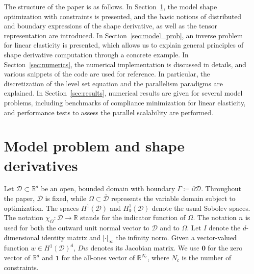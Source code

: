 \documentclass[preprint,9pt]{elsarticle}
\begin{document}
The structure of the paper is as follows. 
In Section~\ref{sec:shape-opt}, the model shape optimization
with constraints is presented, and the basic notions of
distributed and boundary expressions of the shape derivative,
as well as the  tensor representation are introduced. 
In Section~\ref{sec:model_prob}, an inverse problem for
linear elasticity is presented, which allows us to explain
general principles of shape derivative computation through a concrete example.
In Section~\ref{sec:numerics}, the numerical implementation
is discussed in details, and various snippets of the code are used for reference.
In particular, the discretization of the level set equation and
the parallelism paradigms are explained.
In Section~\ref{sec:results}, numerical results are given for
several model problems, including benchmarks of compliance minimization
for linear elasticity, and performance tests to assess
the parallel scalability are performed.

\section{Model problem and shape derivatives}\label{sec:shape-opt}

Let $\mathcal{D}\subset\mathds{R}^d$ be an open, bounded domain with boundary
$\Gamma\coloneqq\partial\mathcal{D}$.
Throughout the paper, $\mathcal{D}$ is fixed,
while $\Omega\subset\overline{\mathcal{D}}$
represents the variable domain subject to optimization.
The spaces $H^1(\mathcal{D})$ and $H^1_0(\mathcal{D})$
denote the usual Sobolev spaces.
The notation $\chi_{\Omega}\colon\overline{\mathcal{D}}\to\mathds{R}$
stands for the indicator function of $\Omega$.
The notation $n$ is used for both
the outward unit normal vector to $\mathcal{D}$ and to $\Omega$. 
Let $I$ denote the $d$-dimensional identity matrix and
$|\cdot|_{\infty}$ the infinity norm.
Given a vector-valued function $w\in H^1(\mathcal{D})^d$,
$Dw$ denotes its Jacobian matrix.
We use $\boldsymbol{0}$ for the zero vector of $\mathds{R}^d$ and 
$\boldsymbol{1}$ for the all-ones vector of $\mathds{R}^{N_c}$,
where $N_c$ is the number of constraints.
\end{document}
